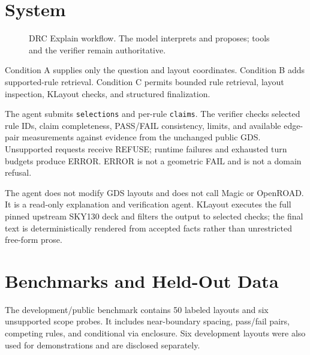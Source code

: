 \documentclass[10pt,twocolumn]{article}
\begin{document}
\section{System}
\begin{figure}[t]
\centering
{}
\caption{DRC Explain workflow. The model interprets and proposes; tools and the verifier remain authoritative.}
\label{fig:system}
\end{figure}

Condition A supplies only the question and layout coordinates. Condition B adds
supported-rule retrieval. Condition C permits bounded rule retrieval, layout
inspection, KLayout checks, and structured finalization.

The agent submits \texttt{selections} and per-rule \texttt{claims}. The verifier checks
selected rule IDs, claim completeness, PASS/FAIL consistency, limits, and available
edge-pair measurements against evidence from the unchanged public GDS. Unsupported
requests receive REFUSE; runtime failures and exhausted turn budgets produce ERROR.
ERROR is not a geometric FAIL and is not a domain refusal.

The agent does not modify GDS layouts and does not call Magic or OpenROAD. It is a
read-only explanation and verification agent. KLayout executes the full pinned
upstream SKY130 deck and filters the output to selected checks; the final text is deterministically rendered
from accepted facts rather than unrestricted free-form prose.

\section{Benchmarks and Held-Out Data}
The development/public benchmark contains 50 labeled layouts and six unsupported
scope probes. It includes near-boundary spacing, pass/fail pairs, competing rules,
and conditional via enclosure. Six development layouts were also used for
demonstrations and are disclosed separately.
\end{document}
